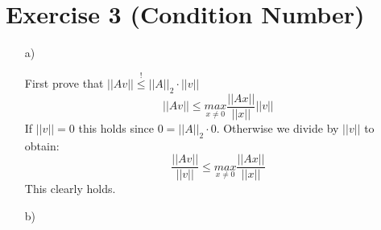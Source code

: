 \documentclass[10pt]{article}
\numberwithin{equation}{section}
\begin{document}
\section*{Exercise 3 (Condition Number)}
\begin{enumerate}
\item[a)]{
  First prove that $||Av|| \overset{!}{\leq}  ||A||_2 \cdot ||v||$ 
    $$||Av|| \leq \underset{x\neq 0}{max} \frac{||Ax||}{||x||} ||v||$$
    If $||v|| = 0$ this holds since $0 = ||A||_2 \cdot 0$. Otherwise we divide by $||v||$ to obtain:
    $$\frac{||Av||}{||v||} \leq \underset{x\neq 0}{max} \frac{||Ax||}{||x||}$$
    This clearly holds.
    


  }
\item[b)]{
  }
\end{enumerate}
\end{document}
